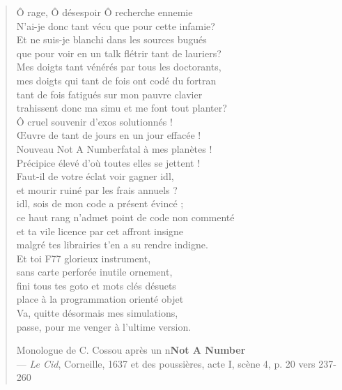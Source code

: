 \begin{quote}
\og Ô rage, Ô désespoir Ô recherche ennemie\\
N'ai-je donc tant vécu que pour cette infamie?\\
Et ne suis-je blanchi dans les sources bugués\\
que pour voir en un talk flétrir tant de lauriers? \\
Mes doigts tant vénérés par tous les doctorants, \\
mes doigts qui tant de fois ont codé du fortran\\
tant de fois fatigués sur mon pauvre clavier\\
trahissent donc ma simu et me font tout planter? \\
Ô cruel souvenir d'exos solutionnés !\\
Œuvre de tant de jours en un jour effacée !\\
Nouveau \og Not A Number\fg fatal à mes planètes !\\
Précipice élevé d'où toutes elles se jettent !\\
Faut-il de votre éclat voir gagner idl, \\
et mourir ruiné par les frais annuels ? \\
idl, sois de mon code a présent évincé ; \\
ce haut rang n'admet point de code non commenté\\
et ta vile licence par cet affront insigne\\
malgré tes librairies t'en a su rendre indigne. \\
Et toi F77 glorieux instrument, \\
sans carte perforée inutile ornement, \\
fini tous tes goto et mots clés désuets\\
place à la programmation orienté objet\\
Va, quitte désormais mes simulations,\\
passe, pour me venger à l'ultime version.\fg

Monologue de C. Cossou après un n\ieme \textbf{Not A Number}\\
  --- \textit{Le Cid}, Corneille, 1637 et des poussières, acte I, scène 4, p. 20 vers 237-260
\end{quote}

